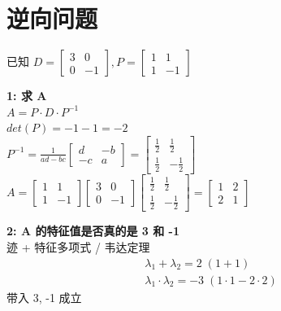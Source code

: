 \documentclass[12pt]{article}
\begin{document}
\section{逆向问题}
\begin{flushleft}
    已知 $D = \begin{bmatrix}
            3 & 0  \\
            0 & -1
        \end{bmatrix}, P = \begin{bmatrix}
            1 & 1  \\
            1 & -1
        \end{bmatrix}$

    \vspace{0.5em}
    \noindent\textbf{1: 求 A} \\
    $A  = P\cdot D \cdot P^{-1}$ \\
    $det(P) = -1 - 1 = -2$ \\
    $P^{-1} = \frac{1}{ad-bc}\begin{bmatrix}
            d  & -b \\
            -c & a
        \end{bmatrix}  = \begin{bmatrix}
            \frac{1}{2} & \frac{1}{2}  \\
            \frac{1}{2} & -\frac{1}{2}
        \end{bmatrix}$ \\
    $A = \begin{bmatrix}
            1 & 1  \\
            1 & -1
        \end{bmatrix}  \begin{bmatrix}
            3 & 0  \\
            0 & -1
        \end{bmatrix} \begin{bmatrix}
            \frac{1}{2} & \frac{1}{2}  \\
            \frac{1}{2} & -\frac{1}{2}
        \end{bmatrix} =  \begin{bmatrix}
            1 & 2 \\
            2 & 1
        \end{bmatrix}$

    \vspace{0.5em}
    \noindent\textbf{2: A 的特征值是否真的是 3 和 -1} \\
    迹 + 特征多项式 / 韦达定理
    \begin{align}
        \lambda_{1} + \lambda_{2} = 2 \;(1 + 1) \\
        \lambda_{1} \cdot \lambda_{2} = -3 \; (1 \cdot  1  - 2 \cdot 2 )
    \end{align}
    带入 3, -1 成立


\end{flushleft}
\end{document}
